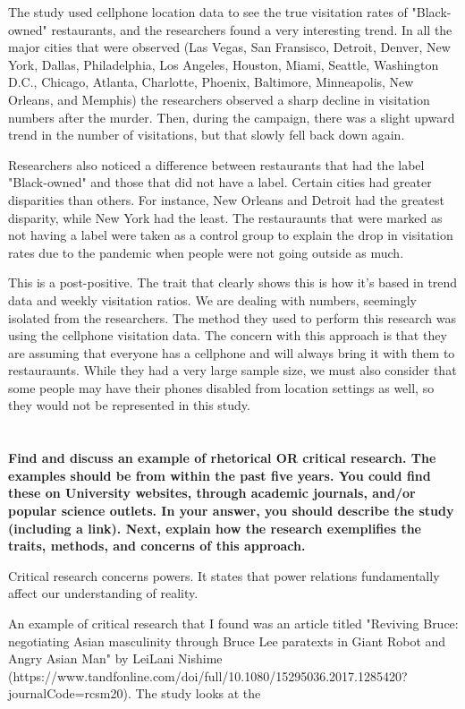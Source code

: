 \documentclass[a4paper]{article}
\begin{document}
        The study used cellphone location data to see the true visitation rates of "Black-owned" restaurants, and the researchers found 
        a very interesting trend. In all the major cities that were observed (Las Vegas, San Fransisco, Detroit, Denver, New York, Dallas, 
        Philadelphia, Los Angeles, Houston, Miami, Seattle, Washington D.C., Chicago, Atlanta, Charlotte, Phoenix, Baltimore, Minneapolis, 
        New Orleans, and Memphis) the researchers observed a sharp decline in visitation numbers after the murder. Then, during the campaign, 
        there was a slight upward trend in the number of visitations, but that slowly fell back down again. 

        Researchers also noticed a difference between restaurants that had the label "Black-owned" and those that did not have a label. 
        Certain cities had greater disparities than others. For instance, New Orleans and Detroit had the greatest disparity, while New York
        had the least. The restauraunts that were marked as not having a label were taken as a control group to explain the drop in 
        visitation rates due to the pandemic when people were not going outside as much. 

        This is a post-positive. The trait that clearly shows this is how it's based in trend data and weekly visitation ratios. We are 
        dealing with numbers, seemingly isolated from the researchers. The method they used to perform this research was using the cellphone 
        visitation data. The concern with this approach is that they are assuming that everyone has a cellphone and will always bring it with them 
        to restauraunts. While they had a very large sample size, we must also consider that some people may have their phones disabled from location 
        settings as well, so they would not be represented in this study. 

    \section{}
        \textbf{Find and discuss an example of rhetorical OR critical research. The examples should be from within the past five years. You could find these on University websites, through academic journals, and/or popular science outlets. In your answer, you should describe the study (including a link). Next, explain how the research exemplifies the traits, methods, and concerns of this approach.}
        
        Critical research concerns powers. It states that power relations fundamentally 
        affect our understanding of reality. 

        An example of critical research that I found was an article titled "Reviving Bruce: negotiating Asian masculinity 
        through Bruce Lee paratexts in Giant Robot and Angry Asian Man" by LeiLani Nishime \cite{nishime2016} 
        ({https://www.tandfonline.com/doi/full/10.1080/15295036.2017.1285420?journalCode=rcsm20}). The study looks at the 
	\pagebreak
    
    
    \cite{wood2017}
    \cite{kobeTweet}
    \cite{eckart2022}
    \cite{nishime2016}
\end{document}
